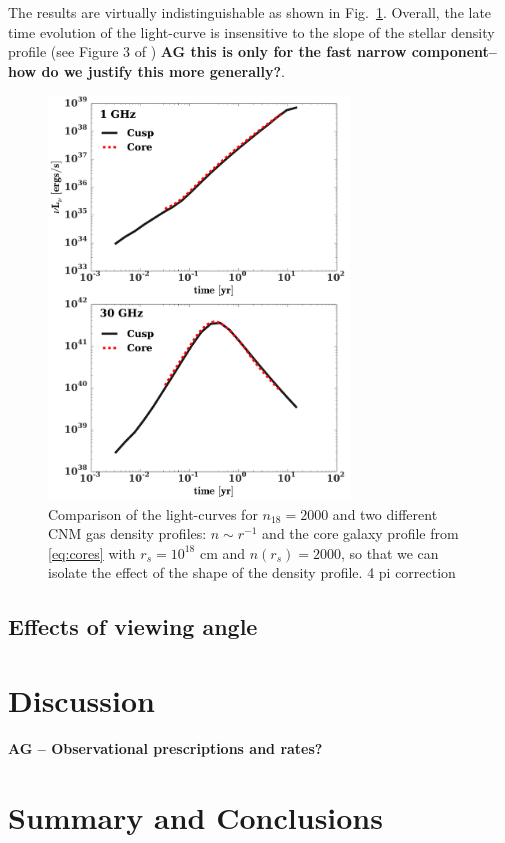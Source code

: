 \documentclass[usenatbib,fleqn]{mnras}
\begin{document}
The results are virtually indistinguishable as shown in
Fig.~\ref{fig:cores}. Overall, the late time evolution of the
light-curve is insensitive to the slope of the stellar density profile
(see Figure 3 of \citealt{Mimica+2015}) {\bf AG this is only for the
  fast narrow component--how do we justify this more generally?}.


\begin{figure} 
  \includegraphics[width=8cm]{fig_cores.pdf}
  \caption{\label{fig:cores} Comparison of the light-curves for
    $n_{18}=2000$ and two different CNM gas density profiles: $n\sim
    r^{-1}$ and the core galaxy profile from \eqref{eq:cores} with
    $r_s=10^{18}$ cm and $n(r_s)=2000$, so that we can isolate the
    effect of the shape of the density profile. 4 pi correction}
\end{figure}


\subsection{Effects of viewing angle}


\section{Discussion}
\label{sec:disc}
{\bf AG -- Observational prescriptions and rates?}

\section{Summary and Conclusions}
\label{sec:conc}

\clearpage
  \footnotesize{
    
    
  }
\end{document}
